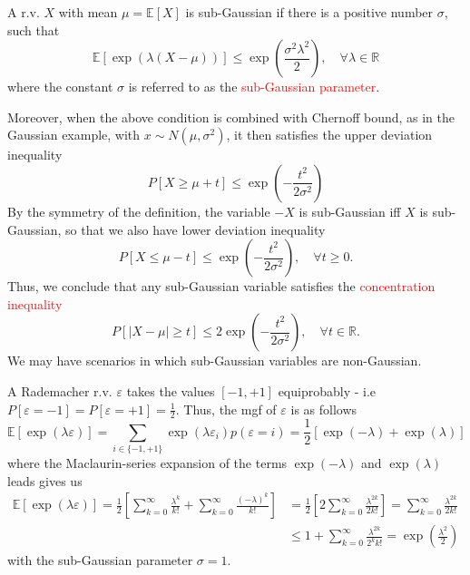 \documentclass[10pt,handout,english]{beamer}
\newcommand{\E}{\mathbb{E}}
\newcommand{\R}{\mathbb{R}}
\newcommand{\1}{\mathbbm{1}}
\begin{document}
\begin{frame}[allowframebreaks]
\begin{definition}
A r.v. $X$ with mean $\mu=\E[X]$ is sub-Gaussian if there is a positive number $\sigma$, such that
\[
\E[\exp(\lambda(X-\mu))]\leq\exp\left(\frac{\sigma^2\lambda^2}{2}\right),\quad\forall\lambda\in\R
\]
where the constant $\sigma$ is referred to as the \textcolor{red}{sub-Gaussian parameter}. 
\end{definition}
Moreover, when the above condition is combined with Chernoff bound, as in the Gaussian example, with $x\sim N(\mu,\sigma^2)$, it then satisfies the upper deviation inequality
\[
P[X\geq\mu+t]\leq\exp\left(-\frac{t^2}{2\sigma^2}\right)
\]
 By the symmetry of the definition, the variable $-X$ is sub-Gaussian iff $X$ is sub-Gaussian, so that we also have lower deviation inequality 
\[
P[X\leq\mu-t ]\leq\exp\left(-\frac{t^2}{2\sigma^2}\right), \quad\forall t\geq 0.
\]
Thus, we conclude that any sub-Gaussian variable satisfies the \textcolor{red}{concentration inequality}
\[
P[\lvert X-\mu\rvert\geq t]\leq2\exp\left(-\frac{t^2}{2\sigma^2}\right),\quad\forall t\in\R.
\]
We may have scenarios in which sub-Gaussian variables are non-Gaussian.
\end{frame}
\begin{frame}
\begin{example}
A Rademacher r.v. $\varepsilon$ takes the values $[-1,+1]$ equiprobably - i.e $P[\varepsilon=-1]=P[\varepsilon=+1]=\frac{1}{2}$. Thus, the mgf of $\varepsilon$ is as follows
\[
\E[\exp(\lambda \varepsilon)]=\sum_{i\in\{-1,+1\}} \exp(\lambda\varepsilon_i)p(\varepsilon=i)=\frac{1}{2}[\exp(-\lambda)+\exp(\lambda)]
\]
where the Maclaurin-series expansion of the terms $\exp(-\lambda)$ and $\exp(\lambda)$ leads gives us
\begin{align*}
\E[\exp(\lambda \varepsilon)]=\frac{1}{2}\left[\sum\limits_{k=0}^{\infty}\frac{\lambda^k}{k!}+\sum\limits_{k=0}^{\infty}\frac{(-\lambda)^k}{k!}\right]&=\frac{1}{2}\left[2\sum\limits_{k=0}^{\infty}\frac{\lambda^{2k}}{2k!}\right]=\sum\limits_{k=0}^{\infty}\frac{\lambda^{2k}}{2k!}\\
&\leq 1+\sum\limits_{k=0}^{\infty}\frac{\lambda^{2k}}{2^kk!}=\exp\left(\frac{\lambda^2}{2}\right)
\end{align*}
with the sub-Gaussian parameter $\sigma=1$.
\end{example}
\end{frame}
\end{document}
